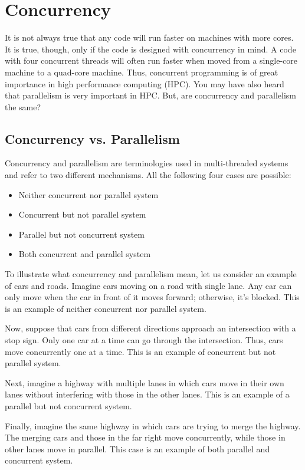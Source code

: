 \documentclass[11pt]{article}
\begin{document}
\section*{Concurrency}
\label{sec:orgheadline6}
It is not always true that any code will run faster on machines with more cores. It is true, though, only if the code is designed with concurrency in mind. A code with four concurrent threads will often run faster when moved from a single-core machine to a quad-core machine. Thus, concurrent programming is of great importance in high performance computing (HPC). You may have also heard that parallelism is very important in HPC. But, are concurrency and parallelism the same?

\subsection*{Concurrency vs. Parallelism}
\label{sec:orgheadline2}
Concurrency and parallelism are terminologies used in multi-threaded systems and refer to two different mechanisms. All the following four cases are possible:
\begin{itemize}
\item Neither concurrent nor parallel system
\item Concurrent but not parallel system
\item Parallel but not concurrent system
\item Both concurrent and parallel system
\end{itemize}
To illustrate what concurrency and parallelism mean, let us consider an example of cars and roads. Imagine cars moving on a road with single lane. Any car can only move when the car in front of it moves forward; otherwise, it's blocked. This is an example of neither concurrent nor parallel system.

Now, suppose that cars from different directions approach an intersection with a stop sign. Only one car at a time can go through the intersection. Thus, cars move concurrently one at a time. This is an example of concurrent but not parallel system.

Next, imagine a highway with multiple lanes in which cars move in their own lanes without interfering with those in the other lanes. This is an example of a parallel but not concurrent system.

Finally, imagine the same highway in which cars are trying to merge the highway. The merging cars and those in the far right move concurrently, while those in other lanes move in parallel. This case is an example of both parallel and concurrent system.
\end{document}
